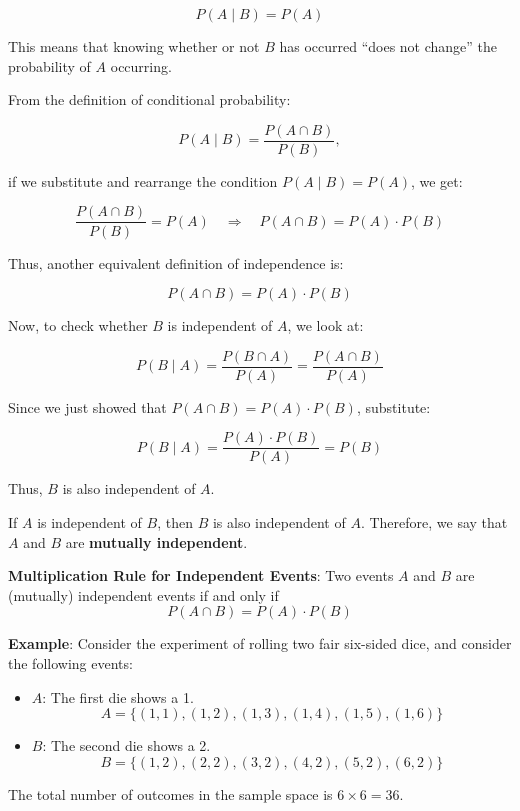 \documentclass[twoside]{book}
\begin{document}
$$
P(A \mid B) = P(A)
$$

This means that knowing whether or not $B$ has occurred ``does not change'' the probability of $A$ occurring.

From the definition of conditional probability:

$$
P(A \mid B) = \frac{P(A \cap B)}{P(B)},
$$

if we substitute and rearrange the condition $P(A \mid B) = P(A)$, we get:

$$
\frac{P(A \cap B)}{P(B)} = P(A) \quad \Rightarrow \quad P(A \cap B) = P(A) \cdot P(B)
$$

Thus, another equivalent definition of independence is:

$$
P(A \cap B) = P(A) \cdot P(B)
$$

Now, to check whether $B$ is independent of $A$, we look at:

$$
P(B \mid A) = \frac{P(B \cap A)}{P(A)} = \frac{P(A \cap B)}{P(A)}
$$

Since we just showed that $P(A \cap B) = P(A) \cdot P(B)$, substitute:

$$
P(B \mid A) = \frac{P(A) \cdot P(B)}{P(A)} = P(B)
$$

Thus, $B$ is also independent of $A$.

\begin{textbox}
If \( A \) is independent of \( B \), then \( B \) is also independent of \( A \). Therefore, we say that \( A \) and \( B \) are \textbf{mutually independent}.
\end{textbox}

\begin{textbox}
\textbf{Multiplication Rule for Independent Events}: Two events $A$ and $B$ are (mutually) independent events if and only if
$$P( A \cap B ) = P( A ) \cdot P( B )$$
\end{textbox}

\textbf{Example}: Consider the experiment of rolling two fair six-sided dice, and consider the following events:
\begin{itemize}
    \item \( A \): The first die shows a 1.  
    \[ A = \{(1,1), (1,2), (1,3), (1,4), (1,5), (1,6)\} \]
    \item \( B \): The second die shows a 2.  
    \[ B = \{(1,2), (2,2), (3,2), (4,2), (5,2), (6,2)\} \]
\end{itemize}

The total number of outcomes in the sample space is \( 6 \times 6 = 36 \).
\end{document}
